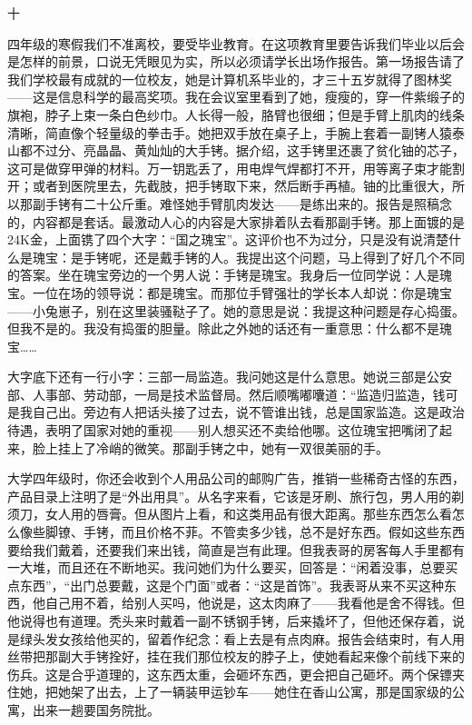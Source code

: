 十 

四年级的寒假我们不准离校，要受毕业教育。在这项教育里要告诉我们毕业以后会是怎样的前景，口说无凭眼见为实，所以必须请学长出场作报告。第一场报告请了我们学校最有成就的一位校友，她是计算机系毕业的，才三十五岁就得了图林奖——这是信息科学的最高奖项。我在会议室里看到了她，瘦瘦的，穿一件紫缎子的旗袍，脖子上束一条白色纱巾。人长得一般，胳臂也很细；但是手臂上肌肉的线条清晰，简直像个轻量级的拳击手。她把双手放在桌子上，手腕上套着一副铐人猿泰山都不过分、亮晶晶、黄灿灿的大手铐。据介绍，这手铐里还裹了贫化铀的芯子，这可是做穿甲弹的材料。万一钥匙丢了，用电焊气焊都打不开，用等离子束才能割开；或者到医院里去，先截肢，把手铐取下来，然后断手再植。铀的比重很大，所以那副手铐有二十公斤重。难怪她手臂肌肉发达——是练出来的。报告是照稿念的，内容都是套话。最激动人心的内容是大家排着队去看那副手铐。那上面镀的是24K金，上面镌了四个大字：“国之瑰宝”。这评价也不为过分，只是没有说清楚什么是瑰宝：是手铐呢，还是戴手铐的人。我提出这个问题，马上得到了好几个不同的答案。坐在瑰宝旁边的一个男人说：手铐是瑰宝。我身后一位同学说：人是瑰宝。一位在场的领导说：都是瑰宝。而那位手臂强壮的学长本人却说：你是瑰宝——小兔崽子，别在这里装骚鞑子了。她的意思是说：我提这种问题是存心捣蛋。但我不是的。我没有捣蛋的胆量。除此之外她的话还有一重意思：什么都不是瑰宝…… 

大字底下还有一行小字：三部一局监造。我问她这是什么意思。她说三部是公安部、人事部、劳动部，一局是技术监督局。然后顺嘴嘟囔道：“监造归监造，钱可是我自己出。旁边有人把话头接了过去，说不管谁出钱，总是国家监造。这是政治待遇，表明了国家对她的重视——别人想买还不卖给他哪。这位瑰宝把嘴闭了起来，脸上挂上了冷峭的微笑。那副手铐之中，她有一双很美丽的手。 

大学四年级时，你还会收到个人用品公司的邮购广告，推销一些稀奇古怪的东西，产品目录上注明了是“外出用具”。从名字来看，它该是牙刷、旅行包，男人用的剃须刀，女人用的唇膏。但从图片上看，和这类用品有很大距离。那些东西怎么看怎么像些脚镣、手铐，而且价格不菲。不管卖多少钱，总不是好东西。假如这些东西要给我们戴着，还要我们来出钱，简直是岂有此理。但我表哥的房客每人手里都有一大堆，而且还在不断地买。我问她们为什么要买，回答是：“闲着没事，总要买点东西”，“出门总要戴，这是个门面”或者：“这是首饰”。我表哥从来不买这种东西，他自己用不着，给别人买吗，他说是，这太肉麻了——我看他是舍不得钱。但他说得也有道理。秃头来时戴着一副不锈钢手铐，后来撬坏了，但他还保存着，说是绿头发女孩给他买的，留着作纪念：看上去是有点肉麻。报告会结束时，有人用丝带把那副大手铐拴好，挂在我们那位校友的脖子上，使她看起来像个前线下来的伤兵。这是合乎道理的，这东西太重，会砸坏东西，更会把自己砸坏。两个保镖夹住她，把她架了出去，上了一辆装甲运钞车——她住在香山公寓，那是国家级的公寓，出来一趟要国务院批。 



